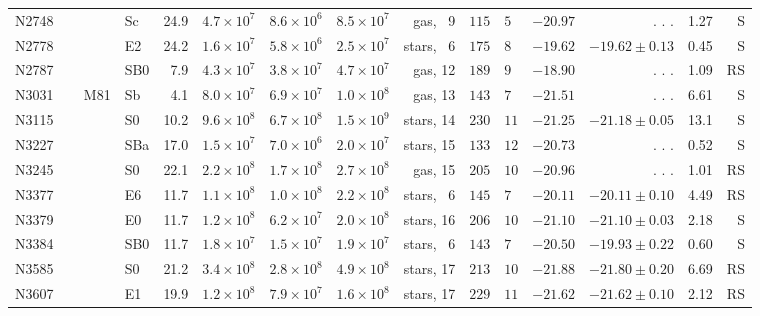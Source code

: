 \documentclass[twosided,letterpaper,numberedappendix]{emulateapj}
\begin{document}
\begin{tabular}{llrrrrrr@{$\pm$}lrrrr}
N2748\tablenotemark{g}       &        Sc &   24.9 & $4.7\times10^{7}$ & $8.6\times10^{6}$ & $8.5\times10^{7}$ &   gas, ~9 & $115$&$ 5$ & $-20.97$ &  . . . &   1.27 & ~S\\
N2778\tablenotemark{h}       &        E2 &   24.2 & $1.6\times10^{7}$ & $5.8\times10^{6}$ & $2.5\times10^{7}$ & stars, ~6 & $175$&$ 8$ & $-19.62$ & $-19.62 \pm 0.13$ &   0.45 & ~S\\
N2787\tablenotemark{g}\tablenotemark{k}       &       SB0 &    7.9 & $4.3\times10^{7}$ & $3.8\times10^{7}$ & $4.7\times10^{7}$ &   gas, 12 & $189$&$ 9$ & $-18.90$ &  . . . &   1.09 & RS\\
 N3031 ~~~ M81 &        Sb &    4.1 & $8.0\times10^{7}$ & $6.9\times10^{7}$ & $1.0\times10^{8}$ &   gas, 13 & $143$&$ 7$ & $-21.51$ &  . . . &   6.61 & ~S\\
 N3115       &        S0 &   10.2 & $9.6\times10^{8}$ & $6.7\times10^{8}$ & $1.5\times10^{9}$ & stars, 14 & $230$&$11$ & $-21.25$ & $-21.18 \pm 0.05$ &   13.1 & ~S\\
N3227\tablenotemark{d}\tablenotemark{g}       &       SBa &   17.0 & $1.5\times10^{7}$ & $7.0\times10^{6}$ & $2.0\times10^{7}$ & stars, 15 & $133$&$12$\tablenotemark{d} & $-20.73$ &  . . . &   0.52 & ~S\\
N3245\tablenotemark{g}       &        S0 &   22.1 & $2.2\times10^{8}$ & $1.7\times10^{8}$ & $2.7\times10^{8}$ &   gas, 15 & $205$&$10$ & $-20.96$ &  . . . &   1.01 & RS\\
N3377\tablenotemark{h}       &        E6 &   11.7 & $1.1\times10^{8}$ & $1.0\times10^{8}$ & $2.2\times10^{8}$ & stars, ~6 & $145$&$ 7$ & $-20.11$ & $-20.11 \pm 0.10$ &   4.49 & RS\\
N3379\tablenotemark{h}       &        E0 &   11.7 & $1.2\times10^{8}$ & $6.2\times10^{7}$ & $2.0\times10^{8}$ & stars, 16 & $206$&$10$ & $-21.10$ & $-21.10 \pm 0.03$ &   2.18 & ~S\\
N3384\tablenotemark{h}\tablenotemark{g}       &       SB0 &   11.7 & $1.8\times10^{7}$ & $1.5\times10^{7}$ & $1.9\times10^{7}$ & stars, ~6 & $143$&$ 7$ & $-20.50$ & $-19.93 \pm 0.22$ &   0.60 & ~S\\
 N3585       &        S0 &   21.2 & $3.4\times10^{8}$ & $2.8\times10^{8}$ & $4.9\times10^{8}$ & stars, 17 & $213$&$10$ & $-21.88$ & $-21.80 \pm 0.20$ &   6.69 & RS\\
 N3607       &        E1 &   19.9 & $1.2\times10^{8}$ & $7.9\times10^{7}$ & $1.6\times10^{8}$ & stars, 17 & $229$&$11$ & $-21.62$ & $-21.62 \pm 0.10$ &   2.12 & RS\\

\end{tabular}
\end{document}
